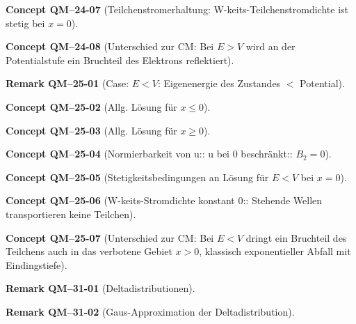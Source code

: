 \documentclass[10pt, letterpaper]{article}
\newcommand{\CustomHeading}[3]{%
  \par\medskip\noindent%
  \textbf{#1 #2} \textnormal{(#3)}.\enskip%
}
\newenvironment{REM}[2]{\CustomHeading{Remark}{#1}{#2}}{}
\newenvironment{CONC}[2]{\CustomHeading{Concept}{#1}{#2}}{}
\begin{document}
\begin{CONC}{QM--24-07}{Teilchenstromerhaltung: W-keits-Teilchenstromdichte ist stetig bei $x=0$}
\end{CONC}

\begin{CONC}{QM--24-08}{Unterschied zur CM: Bei $E>V$ wird an der Potentialstufe ein Bruchteil des Elektrons reflektiert}
\end{CONC}

\begin{REM}{QM--25-01}{Case: $E<V$: Eigenenergie des Zustandes $<$ Potential}
\end{REM}

\begin{CONC}{QM--25-02}{Allg. Lösung für $x\leq 0$}
\end{CONC}

\begin{CONC}{QM--25-03}{Allg. Lösung für $x\geq 0$}
\end{CONC}

\begin{CONC}{QM--25-04}{Normierbarkeit von u:: u bei $0$ beschränkt:: $B_2=0$}
\end{CONC}

\begin{CONC}{QM--25-05}{Stetigkeitsbedingungen an Lösung für $E<V$ bei $x=0$}
\end{CONC}

\begin{CONC}{QM--25-06}{W-keits-Stromdichte konstant 0:: Stehende Wellen transportieren keine Teilchen}
\end{CONC}

\begin{CONC}{QM--25-07}{Unterschied zur CM: Bei $E<V$ dringt ein Bruchteil des Teilchens auch in das verbotene Gebiet $x>0$, klassisch exponentieller Abfall mit Eindingstiefe}
\end{CONC}

\begin{REM}{QM--31-01}{Deltadistributionen}
\end{REM}

\begin{REM}{QM--31-02}{Gaus-Approximation der Deltadistribution}
\end{REM}
\end{document}
